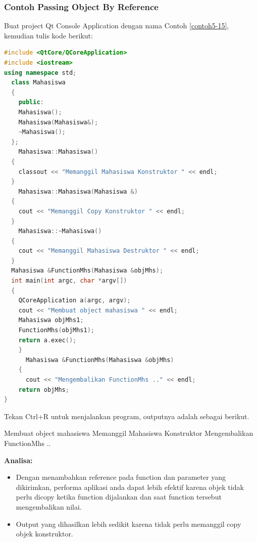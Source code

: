 \subsubsection*{Contoh  Passing Object By Reference}

Buat project Qt Console Application dengan nama Contoh \ref{contoh5-15}, kemudian
tulis kode berikut:

\begin{lstlisting}[language=c++, caption=Passing Object By Reference, label=contoh5-15]
#include <QtCore/QCoreApplication>
#include <iostream>
using namespace std;
  class Mahasiswa
  {
    public:
    Mahasiswa();
    Mahasiswa(Mahasiswa&);
    ~Mahasiswa();
  };
    Mahasiswa::Mahasiswa()
  {
    classout << "Memanggil Mahasiswa Konstruktor " << endl;
  }
    Mahasiswa::Mahasiswa(Mahasiswa &)
  {
    cout << "Memanggil Copy Konstruktor " << endl;
  }
    Mahasiswa::~Mahasiswa()
  {
    cout << "Memanggil Mahasiswa Destruktor " << endl;
  }
  Mahasiswa &FunctionMhs(Mahasiswa &objMhs);
  int main(int argc, char *argv[])
  {
    QCoreApplication a(argc, argv);
    cout << "Membuat object mahasiswa " << endl;
    Mahasiswa objMhs1;
    FunctionMhs(objMhs1);
    return a.exec();
    }
      Mahasiswa &FunctionMhs(Mahasiswa &objMhs)
    {
      cout << "Mengembalikan FunctionMhs .." << endl;
    return objMhs;
}
\end{lstlisting}

Tekan Ctrl+R untuk menjalankan program, outputnya adalah sebagai
berikut.

\begin{lcverbatim}
Membuat object mahasiswa
Memanggil Mahasiswa Konstruktor
Mengembalikan FunctionMhs ..
\end{lcverbatim}

\textbf{Analisa:}

\begin{itemize}

\item
  Dengan menambahkan reference pada function dan parameter yang
  dikirimkan, performa aplikasi anda dapat lebih efektif karena objek
  tidak perlu dicopy ketika function dijalankan dan saat function
  tersebut mengembalikan nilai.
\item
  Output yang dihasilkan lebih sedikit karena tidak perlu memanggil copy
  objek konstruktor.
\end{itemize}
